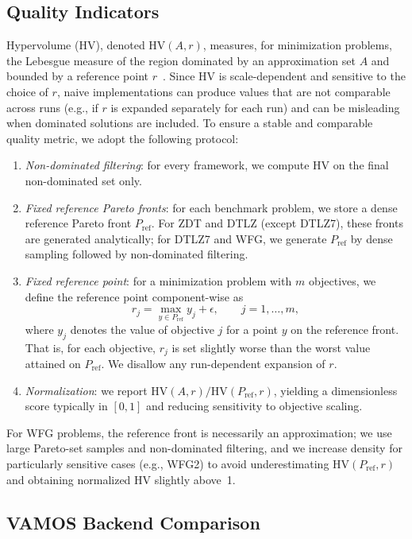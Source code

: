 \documentclass[final,5p,times,twocolumn]{elsarticle}
\newcommand{\VAMOS}{VAMOS}
\newcommand{\HV}{\mathrm{HV}}
\begin{document}
\subsection{Quality Indicators}
\label{sec:hv}

Hypervolume (HV), denoted $\HV(A,r)$, measures, for minimization problems, the Lebesgue measure of the region dominated by an approximation set $A$ and bounded by a reference point $r$~\cite{ZTL+03}. Since HV is scale-dependent and sensitive to the choice of $r$, naive implementations can produce values that are not comparable across runs (e.g., if $r$ is expanded separately for each run) and can be misleading when dominated solutions are included. To ensure a stable and comparable quality metric, we adopt the following protocol:
\begin{enumerate}[leftmargin=*]
  \item \textit{Non-dominated filtering}: for every framework, we compute HV on the final non-dominated set only.
  \item \textit{Fixed reference Pareto fronts}: for each benchmark problem, we store a dense reference Pareto front $P_{\text{ref}}$. For ZDT and DTLZ (except DTLZ7), these fronts are generated analytically; for DTLZ7 and WFG, we generate $P_{\text{ref}}$ by dense sampling followed by non-dominated filtering.
  \item \textit{Fixed reference point}: for a minimization problem with $m$ objectives, we define the reference point component-wise as
  \[
  r_j = \max_{y \in P_{\text{ref}}} y_j + \epsilon, \qquad j = 1, \dots, m,
  \]
  where $y_j$ denotes the value of objective $j$ for a point $y$ on the reference front. That is, for each objective, $r_j$ is set slightly worse than the worst value attained on $P_{\text{ref}}$. We disallow any run-dependent expansion of $r$.
  \item \textit{Normalization}: we report $\HV(A,r) / \HV(P_{\text{ref}},r)$, yielding a dimensionless score typically in $[0,1]$ and reducing sensitivity to objective scaling.
\end{enumerate}


For WFG problems, the reference front is necessarily an approximation; we use large Pareto-set samples and non-dominated filtering, and we increase density for particularly sensitive cases (e.g., WFG2) to avoid underestimating $\HV(P_{\text{ref}}, r)$ and obtaining normalized HV slightly above~1.

\subsection{\VAMOS{} Backend Comparison}
\end{document}
